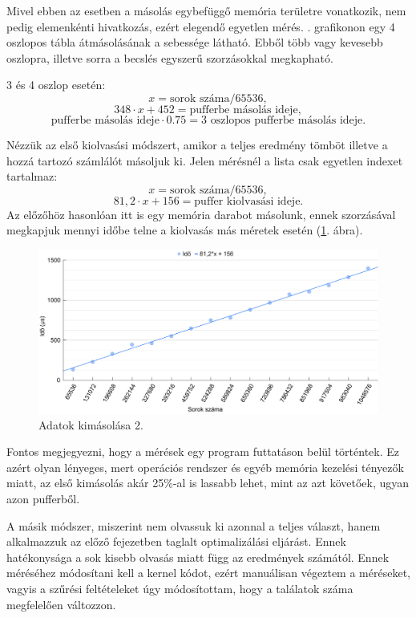 Mivel ebben az esetben a másolás egybefüggő memória területre vonatkozik, nem pedig elemenkénti hivatkozás, ezért elegendő egyetlen mérés.
. grafikonon egy 4 oszlopos tábla átmásolásának a sebessége látható. Ebből több vagy kevesebb oszlopra, illetve sorra a becslés egyszerű szorzásokkal megkapható.

3 és 4 oszlop esetén:
$$ x = \text{sorok száma} / 65536, $$
$$ 348 \cdot x + 452 = \text{pufferbe másolás ideje}, $$ 
$$ \text{pufferbe másolás ideje} \cdot 0.75 = \text{3 oszlopos pufferbe másolás ideje}. $$


Nézzük az első kiolvasási módszert, amikor a teljes eredmény tömböt illetve a hozzá tartozó számlálót másoljuk ki.
Jelen mérésnél a lista csak egyetlen indexet tartalmaz:
$$ x = \text{sorok száma} / 65536, $$
$$ 81,2 \cdot x + 156 = \text{puffer kiolvasási ideje}. $$ 
Az előzőhöz hasonlóan itt is egy memória darabot másolunk, ennek szorzásával megkapjuk mennyi időbe telne a kiolvasás más méretek esetén (\ref{fig:pufferout}. ábra).

\begin{figure}[h!]
	\centering
	\includegraphics[width=14.8cm]{images/graph/pufferout.png}
	\caption{Adatok kimásolása 2.}
	\label{fig:pufferout}
\end{figure}

Fontos megjegyezni, hogy a mérések egy program futtatáson belül történtek. Ez azért olyan lényeges, mert operációs rendszer és egyéb memória kezelési tényezők miatt, az első kimásolás akár 25\%-al is lassabb lehet, mint az azt követőek, ugyan azon pufferből.

A másik módszer, miszerint nem olvassuk ki azonnal a teljes választ, hanem alkalmazzuk az előző fejezetben taglalt optimalizálási eljárást.
Ennek hatékonysága a sok kisebb olvasás miatt függ az eredmények számától. Ennek méréséhez módosítani kell a kernel kódot, ezért manuálisan végeztem a méréseket, vagyis a szűrési feltételeket úgy módosítottam, hogy a találatok száma megfelelően változzon.

